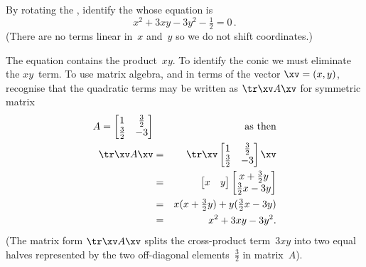 \begin{example} \label{eg:csrc2}
By rotating the , identify the  whose equation is
\begin{equation*}
x^2+3xy-3y^2-\tfrac12=0\,.
\end{equation*}
(There are no terms linear in~\(x\) and~\(y\) so we do not shift coordinates.)
\begin{solution} 
The equation contains the product~\(xy\).
To identify the conic we must eliminate the \(xy\)~term.
To use matrix algebra, and in terms of the vector \(\xv=(x,y)\), recognise that the quadratic terms may be written as \(\tr\xv A\xv\) for symmetric matrix
\begin{eqnarray*}
A=\begin{bmatrix} 1&\frac32\\\frac32&-3 \end{bmatrix}
&&\text{as then}
\\\tr\xv A\xv
&=&\tr\xv\begin{bmatrix} 1&\frac32\\\frac32&-3 \end{bmatrix}\xv
\\&=&\begin{bmatrix} x&y \end{bmatrix}\begin{bmatrix} x+\frac32y\\\frac32x-3y \end{bmatrix}
\\&=&x(x+\tfrac32y)+y(\tfrac32x-3y)
\\&=&x^2+3xy-3y^2.
\end{eqnarray*}
(The matrix form \(\tr\xv A\xv\) splits the cross-product term~\(3xy\) into two equal halves represented by the two off-diagonal elements~\(\tfrac32\) in matrix~\(A\)).
\def\temp#1{\begin{tikzpicture}
  \begin{axis}[footnotesize,font=\footnotesize ,axis equal image
  , xlabel={$x$}, ylabel={$y$}, axis lines=middle
  , xtick={-1,1,2}, ytick={-2,-1,1,2}  ]
  \addplot[brown,quiver={u=1,v=-3},-stealth] coordinates {(-1/3,3/3)};
  \node[brown,right] at (axis cs:0.566,-1.7) {$x'$};
  \addplot[brown,quiver={u=0.316,v=-0.949},-stealth,thick] coordinates {(0,0)};
  \node[brown,right] at (axis cs:0.316,-0.949) {$\vec v_1$};
  \addplot[brown,quiver={u=3,v=1},-stealth] coordinates {(-3/3,-1/3)};
  \node[brown,above] at (axis cs:1.7,0.566) {$y'$};
  \addplot[brown,quiver={u=0.949,v=0.316},-stealth,thick] coordinates {(0,0)};

\end{axis}
\end{tikzpicture}}
\end{solution}
\end{example}
